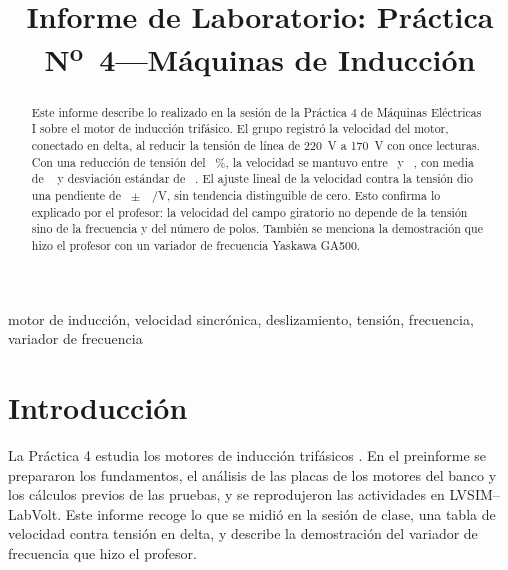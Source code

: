 \documentclass[conference]{IEEEtran}
\begin{document}
\title{Informe de Laboratorio: Práctica N\textsuperscript{o}~4---Máquinas de Inducción}

\author{
}

\maketitle

\begin{abstract}
Este informe describe lo realizado en la sesión de la Práctica 4 de Máquinas Eléctricas I sobre el motor de inducción trifásico. El grupo registró la velocidad del motor, conectado en delta, al reducir la tensión de línea de \SI{220}{V} a \SI{170}{V} con once lecturas. Con una reducción de tensión del \ClVred~\%, la velocidad se mantuvo entre \ClMin\ y \ClMax~\si{\rpm}, con media de \ClMean~\si{\rpm} y desviación estándar de \ClSd~\si{\rpm}. El ajuste lineal de la velocidad contra la tensión dio una pendiente de \ClSlope~$\pm$~\ClSlopeSE~\si{\rpm/V}, sin tendencia distinguible de cero. Esto confirma lo explicado por el profesor: la velocidad del campo giratorio no depende de la tensión sino de la frecuencia y del número de polos. También se menciona la demostración que hizo el profesor con un variador de frecuencia Yaskawa GA500.
\end{abstract}

\begin{IEEEkeywords}
motor de inducción, velocidad sincrónica, deslizamiento, tensión, frecuencia, variador de frecuencia
\end{IEEEkeywords}

\section{Introducción}
La Práctica 4 estudia los motores de inducción trifásicos \cite{guia}. En el preinforme \cite{preinforme} se prepararon los fundamentos, el análisis de las placas de los motores del banco y los cálculos previos de las pruebas, y se reprodujeron las actividades en LVSIM--LabVolt. Este informe recoge lo que se midió en la sesión de clase, una tabla de velocidad contra tensión en delta, y describe la demostración del variador de frecuencia que hizo el profesor.
\end{document}
